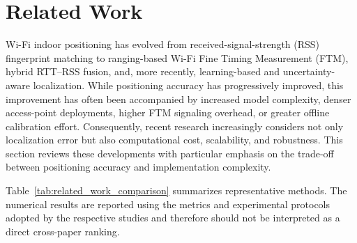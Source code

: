 \section{Related Work}
\label{sec:related_work}

Wi-Fi indoor positioning has evolved from received-signal-strength (RSS) fingerprint matching to ranging-based Wi-Fi Fine Timing Measurement (FTM), hybrid RTT--RSS fusion, and, more recently, learning-based and uncertainty-aware localization. While positioning accuracy has progressively improved, this improvement has often been accompanied by increased model complexity, denser access-point deployments, higher FTM signaling overhead, or greater offline calibration effort. Consequently, recent research increasingly considers not only localization error but also computational cost, scalability, and robustness. This section reviews these developments with particular emphasis on the trade-off between positioning accuracy and implementation complexity.

Table~\ref{tab:related_work_comparison} summarizes representative methods. The numerical results are reported using the metrics and experimental protocols adopted by the respective studies and therefore should not be interpreted as a direct cross-paper ranking.

